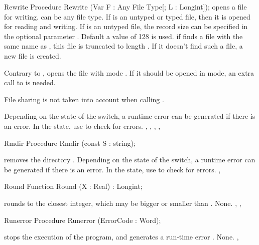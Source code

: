 \begin{procedure}{Rewrite}
\Declaration
Procedure Rewrite (Var F : Any File Type[; L : Longint]);
\Description
{} opens a file  for writing.  can be any file type.
If  is an untyped or typed file, then it is opened for reading and
writing. If  is an untyped file, the record size can be specified in
the optional parameter . Default a value of 128 is used.
if  finds a file with the same name as , this file is
truncated to length . If it doesn't find such a file, a new file is
created.

Contrary to \tp, \fpc opens the file with mode . If it should
be opened in  mode, an extra call to  is needed.

File sharing is not taken into account when calling .

\Errors
Depending on the state of the  switch, a runtime error can be 
generated if there is an error. In the  state, use 
to check for errors.
\SeeAlso
{}, , , , 
\end{procedure}


\begin{procedure}{Rmdir}
\Declaration
Procedure Rmdir (const S : string);

\Description
{} removes the directory .
\Errors
\Errors
Depending on the state of the  switch, a runtime error can be 
generated if there is an error. In the  state, use 
to check for errors.
\SeeAlso
{}, 
\end{procedure}


\begin{function}{Round}
\Declaration
Function Round (X : Real) : Longint;

\Description
{} rounds  to the closest integer, which may be bigger or
smaller than .
\Errors
None.
\SeeAlso
{}, , 
\end{function}


\begin{procedure}{Runerror}
\Declaration
Procedure Runerror (ErrorCode : Word);

\Description
{} stops the execution of the program, and generates a
run-time error .
\Errors
None.
\SeeAlso
{}, 
\end{procedure}

